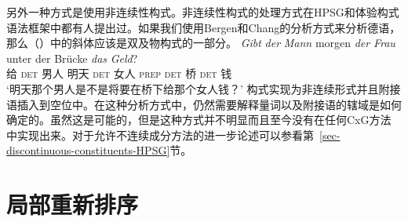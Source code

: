 另外一种方式是使用非连续性构式。非连续性构式的处理方式在HPSG\citep{Reape94a}和体验构式语法\citep{BC2005a}框架中都有人提出过。如果我们使用Bergen和Chang的分析方式来分析德语，那么（）中的斜体应该是双及物构式的一部分。
\ea
\gll \emph{Gibt} \emph{der} \emph{Mann} morgen \emph{der} \emph{Frau} unter der Brücke \emph{das} \emph{Geld}?\\
	 给 \textsc{det} 男人 明天 \textsc{det} 女人 \textsc{prep} \textsc{det} 桥 \textsc{det} 钱\\
\glt `明天那个男人是不是将要在桥下给那个女人钱？'
\z
构式实现为非连续形式并且附接语插入到空位中。在这种分析方式中，仍然需要解释量词以及附接语的辖域是如何确定的。虽然这是可能的，但是这种方式并不明显而且至今没有在任何CxG方法中实现出来。对于允许不连续成分方法的进一步论述可以参看第~\ref{sec-discontinuous-constituents-HPSG}节。

\section{局部重新排序}


